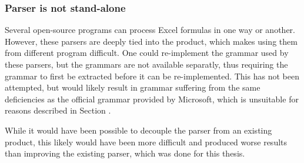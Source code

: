 \subsubsection{Parser is not stand-alone}

Several open-source programs \cite{libreoffice,calligra,gnumeric} can process Excel formulas in one way or another.
However, these parsers are deeply tied into the product, which makes using them from different program difficult.
One could re-implement the grammar used by these parsers, but the grammars are not available separatly, thus requiring the grammar to first be extracted before it can be re-implemented. This has not been attempted, but would likely result in grammar suffering from the same deficiencies as the official grammar provided by Microsoft, which is unsuitable for reasons described in Section \label{sec:motivation}.

While it would have been possible to decouple the parser from an existing product, this likely would have been more difficult and produced worse results than improving the existing parser, which was done for this thesis.